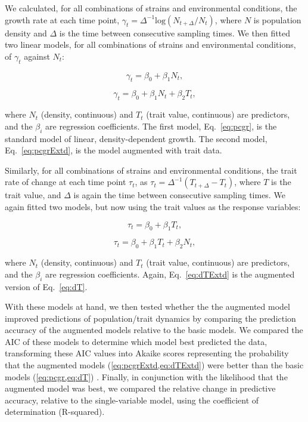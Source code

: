 \documentclass{article}
\begin{document}

We calculated, for all combinations of strains and environmental conditions, the growth rate at each time point, $\gamma_t=\Delta^{-1}\textrm{log}(N_{t+\Delta}/N_t)$, where $N$ is population density and $\Delta$ is the time between consecutive sampling times. We then fitted two linear models, for all combinations of strains and environmental conditions, of $\gamma_t$ against $N_t$:

\begin{equation}
\label{eq:pcgr}
\gamma_t = \beta_0 + \beta_1 N_t,
\end{equation}

\begin{equation}
\label{eq:pcgrExtd}
\gamma_t = \beta_0 + \beta_1 N_t + \beta_2 T_t,
\end{equation}

where $N_t$ (density, continuous) and $T_t$ (trait value, continuous) are predictors, and the $\beta_i$ are regression coefficients. The first model, Eq.~\ref{eq:pcgr}, is the standard model of linear, density-dependent growth. The second model, Eq.~\ref{eq:pcgrExtd}, is the model augmented with trait data.

Similarly, for all combinations of strains and environmental conditions, the trait rate of change at each time point $\tau_t$, as $\tau_t=\Delta^{-1}(T_{t+\Delta}-T_{t})$, where $T$ is the trait value, and $\Delta$ is again the time between consecutive sampling times. We again fitted two models, but now using the trait values as the response variables:

\begin{equation}
\label{eq:dT}
\tau_t = \beta_0 + \beta_1 T_t,
\end{equation}

\begin{equation}
\label{eq:dTExtd}
\tau_t = \beta_0 + \beta_1 T_t + \beta_2 N_t,
\end{equation}

where $N_t$ (density, continuous) and $T_t$ (trait value, continuous) are predictors, and the $\beta_i$ are regression coefficients. Again, Eq.~\ref{eq:dTExtd} is the augmented version of Eq.~\ref{eq:dT}. 

With these models at hand, we then tested whether the the augmented model improved predictions of population/trait dynamics by comparing the prediction accuracy of the augmented models relative to the basic models. We compared the AIC of these models to determine which model best predicted the data, transforming these AIC values into Akaike scores representing the probability that the augmented models (\cref{eq:pcgrExtd,eq:dTExtd}) were better than the basic models (\cref{eq:pcgr,eq:dT}) \cite{Wagenmakers2004,Burnham2004}. Finally, in conjunction with the likelihood that the augmented model was best, we compared the relative change in predictive accuracy, relative to the single-variable model, using the coefficient of determination (R-squared). 
\end{document}
